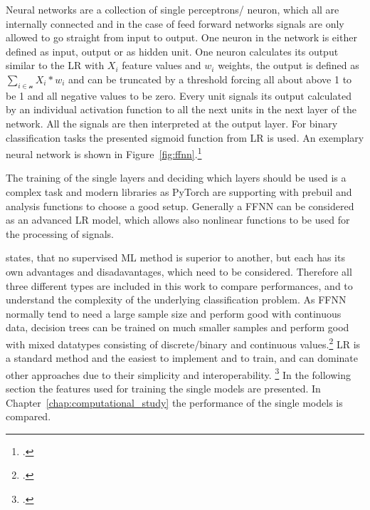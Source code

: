 Neural networks are a collection of single perceptrons/ neuron, which all are internally connected and
in the case of feed forward networks signals are only allowed to go straight from input to output. One neuron
in the network is either defined as input, output or as hidden unit. One neuron calculates its
output similar to the \gls{LR} with $X_i$ feature values and $w_i$ weights, the output is defined
as $\sum_{i \in \mathcal{n}} X_i * w_i$ and can be truncated by a threshold forcing all about above 1
to be 1 and all negative values to be zero. Every unit signals its output calculated by an individual
activation function to all the next units in the next layer of the network. All the signals are
then interpreted at the output layer. For binary classification tasks the presented sigmoid function from \gls{LR} is used.
An exemplary neural network is shown in Figure~\ref{fig:ffnn}.\footcite[cf.][p.255]{kotsiantis_supervised_2007}



The training of the single layers and deciding which layers should be used is a complex task
and modern libraries as PyTorch are supporting with prebuil and analysis functions to choose
a good setup. Generally a \gls{FFNN} can be considered as an advanced \gls{LR} model,
which allows also nonlinear functions to be used for the processing of signals.

\parbreak
\cite{kotsiantis_supervised_2007} states, that no supervised \gls{ML} method is superior to another,
but each has its own advantages and disadavantages, which need to be considered.
Therefore all three different types are included in this work to compare performances, and
to understand the complexity of the underlying classification problem. As \gls{FFNN} normally
tend to need a large sample size and perform good with continuous data, decision trees can be
trained on much smaller samples and perform good with mixed datatypes consisting of discrete/binary
and continuous values.\footcite[cf.][pp. 262ff.]{kotsiantis_supervised_2007}
\gls{LR} is a standard method and the easiest to implement and to train, and can dominate
other approaches due to their simplicity and interoperability. \footcite[cf.][p.8]{kirasich_random_2018}
In the following section the features used for training the single models are presented.
In Chapter~\ref{chap:computational_study} the performance of the single models is compared.

\begin{comment}
\section{Model Training}
\label{sec:ModelTraining}

Training is based on which model selected, XGBoost or /gls{FFNN} from pytorch library or others. Afterwards the Mini batch descent
algorithm to train the model!
\end{comment}

